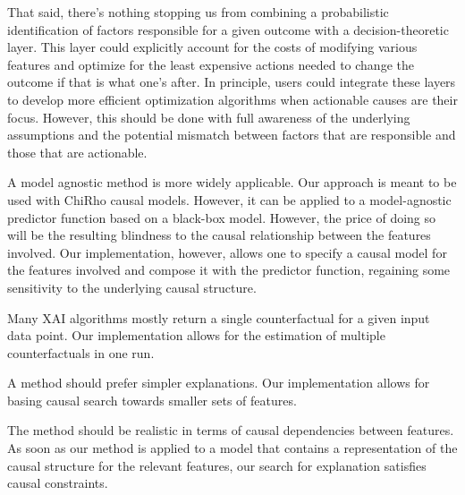\documentclass{article}
\begin{document}
\begin{description}
   That said, there’s nothing stopping us from combining a probabilistic identification of factors responsible for a given outcome with a decision-theoretic layer. This layer could explicitly account for the costs of modifying various features and optimize for the least expensive actions needed to change the outcome if that is what one's after. In principle, users could integrate these layers to develop more efficient optimization algorithms when actionable causes are their focus. However, this should be done with full awareness of the underlying assumptions and the potential mismatch between factors that are responsible and those that are actionable.


\item[Model agnosticism] A model agnostic method is more widely applicable. Our approach is meant to be used with ChiRho causal models. However, it can be applied to a model-agnostic predictor function based on a black-box model. However, the price of doing so will be the resulting blindness to the causal relationship between the features involved. Our implementation, however, allows one to specify a causal model for the features involved and compose it with the predictor function, regaining some sensitivity to the underlying causal structure. 

\item[Multiple counterfactuals] Many XAI algorithms mostly return a single counterfactual for a
given input data point. Our implementation  allows for the estimation of multiple counterfactuals in one run. 



\item[Sparsity] A method should prefer simpler explanations. Our implementation allows for basing causal search towards smaller sets of features.

\item[Causal constraint satisfaction] The method should be realistic in terms of causal dependencies between features. As soon as our method is applied to a model that contains a representation of the causal structure for the relevant features, our search for explanation satisfies causal constraints.


\end{description}










\end{document}
